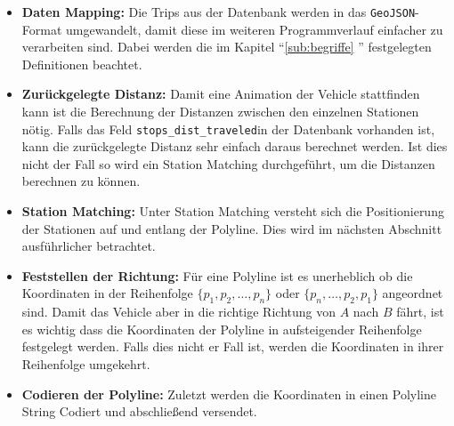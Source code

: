   \begin{itemize}
    \item \textbf{Daten Mapping:} Die Trips aus der Datenbank werden in das \texttt{GeoJSON}-Format umgewandelt, damit diese im weiteren Programmverlauf einfacher zu verarbeiten sind. Dabei werden die im Kapitel "`\ref{sub:begriffe} "' festgelegten Definitionen beachtet.

    \item \textbf{Zurückgelegte Distanz:} Damit eine Animation der Vehicle stattfinden kann ist die Berechnung der Distanzen zwischen den einzelnen Stationen nötig. Falls das Feld \texttt{stops\_dist\_traveled}\footnotemark in der Datenbank vorhanden ist, kann die zurückgelegte Distanz sehr einfach daraus berechnet werden. Ist dies nicht der Fall so wird ein Station Matching durchgeführt, um die Distanzen berechnen zu können.

    \item \textbf{Station Matching:} Unter Station Matching versteht sich die Positionierung der Stationen auf und entlang der Polyline. Dies wird im nächsten Abschnitt ausführlicher betrachtet.

    \item \textbf{Feststellen der Richtung:} Für eine Polyline ist es unerheblich ob die Koordinaten in der Reihenfolge $\{ p_1, p_2, \dotsc, p_n \}$ oder $\{ p_n, \dotsc, p_2, p_1 \}$ angeordnet sind. Damit das Vehicle aber in die richtige Richtung von $A$ nach $B$ fährt, ist es wichtig dass die Koordinaten der Polyline in aufsteigender Reihenfolge festgelegt werden. Falls dies nicht er Fall ist, werden die Koordinaten in ihrer Reihenfolge umgekehrt.

    \item \textbf{Codieren der Polyline:} Zuletzt werden die Koordinaten in einen Polyline String Codiert und abschließend versendet.
  \end{itemize}

  


